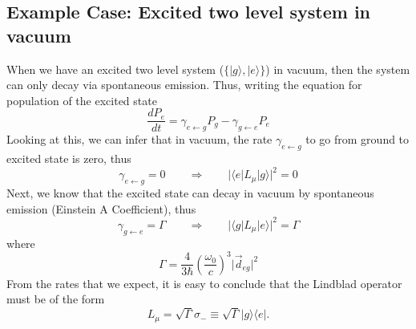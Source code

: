 \documentclass[aps,prb,onecolumn,notitlepage,showpacs,floatfix,superscriptaddress]{revtex4-1}
\begin{document}
\subsection{Example Case: Excited two level system in vacuum}
When we have an excited two level system ($\{\vert g \rangle, \vert e \rangle \}$) in vacuum, then the system can only decay via spontaneous emission. Thus, writing the equation for population of the excited state
\begin{equation}
\dfrac{dP_e}{dt} = \gamma_{e \leftarrow g} P_g - \gamma_{g \leftarrow e} P_e
\end{equation}
Looking at this, we can infer that in vacuum, the rate $\gamma_{e \leftarrow g}$ to go from ground to excited state is zero, thus
\begin{equation}
\gamma_{e \leftarrow g} = 0 \qquad \Rightarrow \qquad \vert \langle e \vert L_\mu \vert g \rangle \vert^2 = 0
\end{equation}
Next, we know that the excited state can decay in vacuum by spontaneous emission (Einstein A Coefficient), thus
\begin{equation}
\gamma_{g \leftarrow e} = \Gamma \qquad \Rightarrow \qquad \vert \langle g \vert L_\mu \vert e \rangle \vert^2 = \Gamma
\end{equation}
where 
\begin{equation}
\Gamma = \dfrac{4}{3\hbar} \left(\dfrac{\omega_0}{c} \right)^3 \vert \vec{d}_{eg} \vert^2
\end{equation}
From the rates that we expect, it is easy to conclude that the Lindblad operator must be of the form
\begin{equation}
L_\mu = \sqrt{\Gamma} \sigma_- \equiv \sqrt{\Gamma} \vert g \rangle \langle e \vert.
\end{equation}
\end{document}
